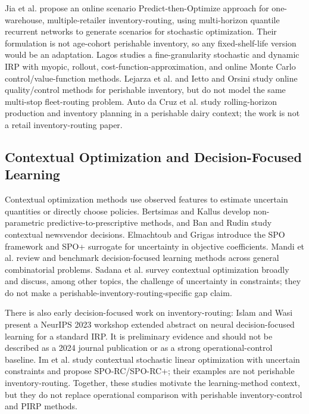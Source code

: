 \documentclass[11pt,a4paper]{article}
\theoremstyle{definition}
\theoremstyle{remark}
\begin{document}
Jia et al. \citeyearpar{jia2025scenario} propose an online scenario Predict-then-Optimize approach for one-warehouse, multiple-retailer inventory-routing, using multi-horizon quantile recurrent networks to generate scenarios for stochastic optimization. Their formulation is not age-cohort perishable inventory, so any fixed-shelf-life version would be an adaptation. Lagos \citeyearpar{lagos2026stochastic} studies a fine-granularity stochastic and dynamic IRP with myopic, rollout, cost-function-approximation, and online Monte Carlo control/value-function methods. Lejarza et al. \citeyearpar{lejarza2024rolling} and Ietto and Orsini \citeyearpar{ietto2025data} study online quality/control methods for perishable inventory, but do not model the same multi-stop fleet-routing problem. Auto da Cruz et al. \citeyearpar{dacruz2025rolling} study rolling-horizon production and inventory planning in a perishable dairy context; the work is not a retail inventory-routing paper.

\subsection{Contextual Optimization and Decision-Focused Learning}
\label{subsec:lit_dfl}

Contextual optimization methods use observed features to estimate uncertain quantities or directly choose policies. Bertsimas and Kallus \citeyearpar{bertsimas2020predictive} develop non-parametric predictive-to-prescriptive methods, and Ban and Rudin \citeyearpar{ban2019big} study contextual newsvendor decisions. Elmachtoub and Grigas \citeyearpar{elmachtoub2022smart} introduce the SPO framework and SPO+ surrogate for uncertainty in objective coefficients. Mandi et al. \citeyearpar{mandi2024decision} review and benchmark decision-focused learning methods across general combinatorial problems. Sadana et al. \citeyearpar{sadana2025survey} survey contextual optimization broadly and discuss, among other topics, the challenge of uncertainty in constraints; they do not make a perishable-inventory-routing-specific gap claim.

There is also early decision-focused work on inventory-routing: Islam and Wasi \citeyearpar{islam2023optimizing} present a NeurIPS 2023 workshop extended abstract on neural decision-focused learning for a standard IRP. It is preliminary evidence and should not be described as a 2024 journal publication or as a strong operational-control baseline. Im et al. \citeyearpar{im2025smart} study contextual stochastic linear optimization with uncertain constraints and propose SPO-RC/SPO-RC+; their examples are not perishable inventory-routing. Together, these studies motivate the learning-method context, but they do not replace operational comparison with perishable inventory-control and PIRP methods.
\end{document}

